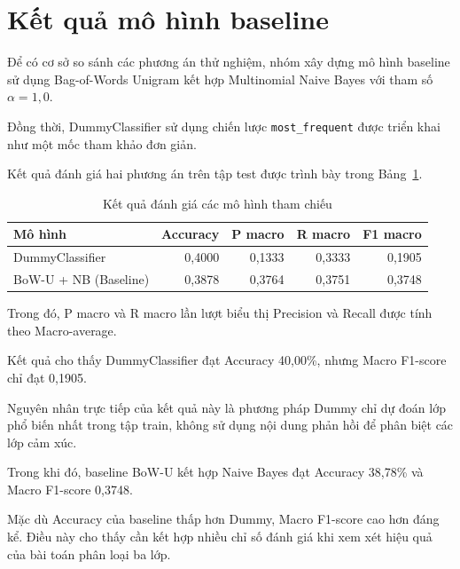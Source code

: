 
\section{Kết quả mô hình baseline}

Để có cơ sở so sánh các phương án thử nghiệm,
nhóm xây dựng mô hình baseline sử dụng
Bag-of-Words Unigram kết hợp Multinomial Naive Bayes
với tham số $\alpha=1,0$.

Đồng thời, DummyClassifier sử dụng chiến lược
\texttt{most\_frequent} được triển khai như
một mốc tham khảo đơn giản.

Kết quả đánh giá hai phương án trên tập test
được trình bày trong Bảng~\ref{tab:ch4-baseline}.

\begin{table}[H]
\centering
\caption{Kết quả đánh giá các mô hình tham chiếu}
\label{tab:ch4-baseline}
\renewcommand{\arraystretch}{1.15}
\small

\begin{tabularx}{\textwidth}{|X|r|r|r|r|}
\hline
\textbf{Mô hình}
& \textbf{Accuracy}
& \textbf{P macro}
& \textbf{R macro}
& \textbf{F1 macro} \\
\hline

DummyClassifier
& 0,4000
& 0,1333
& 0,3333
& 0,1905 \\
\hline

BoW-U + NB (Baseline)
& 0,3878
& 0,3764
& 0,3751
& 0,3748 \\
\hline

\end{tabularx}
\end{table}

Trong đó, P macro và R macro lần lượt biểu thị
Precision và Recall được tính theo Macro-average.

Kết quả cho thấy DummyClassifier đạt Accuracy
40,00\%, nhưng Macro F1-score chỉ đạt 0,1905.

Nguyên nhân trực tiếp của kết quả này là phương
pháp Dummy chỉ dự đoán lớp phổ biến nhất trong tập
train, không sử dụng nội dung phản hồi để phân biệt
các lớp cảm xúc.

Trong khi đó, baseline BoW-U kết hợp Naive Bayes
đạt Accuracy 38,78\% và Macro F1-score 0,3748.

Mặc dù Accuracy của baseline thấp hơn Dummy,
Macro F1-score cao hơn đáng kể. Điều này cho thấy
cần kết hợp nhiều chỉ số đánh giá khi xem xét
hiệu quả của bài toán phân loại ba lớp.

